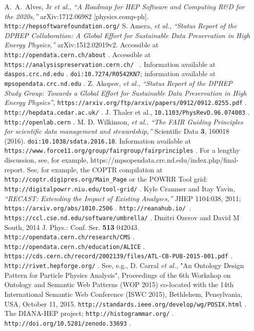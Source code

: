 \documentclass[11pt]{article}
\begin{document}
\begin{thebibliography}{99}
  A.~A.~Alves, Jr {\it et al.},
  {\it ``A Roadmap for HEP Software and Computing R\&D for the 2020s,''}
  arXiv:1712.06982 [physics.comp-ph].
 {\tt http://hepsoftwarefoundation.org/}
 S. Amera, {\it et al.}, {\it ``Status Report of the DPHEP Collaboration: A Global Effort for Sustainable Data Preservation in High Energy Physics,''} arXiv:1512.02019v2.
 Accessible at {\tt http://opendata.cern.ch/about} .
 Accessible at {\tt https://analysispreservation.cern.ch/ } .
 Information available at {\tt daspos.crc.nd.edu} .
 {\tt  doi:10.7274/R0542KN7}; information available at {\tt mpsopendata.crc.nd.edu} .
 Z. Akopov, {\it et al.}, {\it ``Status Report of the DPHEP Study Group: Towards a Global Effort for Sustainable Data Preservation in High Energy Physics''}, {\tt https://arxiv.org/ftp/arxiv/papers/0912/0912.0255.pdf} .
 {\tt http://hepdata.cedar.ac.uk/} .
 J. Thaler et al., {\tt 10.1103/PhysRevD.96.074003} .
 {\tt http://openlab.cern} .
 M. D. Wilkinson, {\it et al.}, {\it ``The FAIR Guiding Principles for scientific data management and stewardship,''} Scientific Data {\bf 3}, 160018 (2016).  {\tt doi:10.1038/sdata.2016.18}.  Information available at {\tt https://www.force11.org/group/fairgroup/fairprinciples} .
 For a lengthy discussion, see, for example, https://mpsopendata.crc.nd.edu/index.php/final-report.
 See, for example, the COPTR compilation at {\tt http://coptr.digipres.org/Main\_Page} or the POWRR Tool grid: {\tt http://digitalpowrr.niu.edu/tool-grid/} .
 Kyle Cranmer and Itay Yavin, {\it ``RECAST: Extending the Impact of Existing Analyses,''} JHEP 1104:038, 2011; {\tt https://arxiv.org/abs/1010.2506} .
 {\tt http://reanahub.io/ }.
 {\tt https://ccl.cse.nd.edu/software/umbrella/} .
 Dmitri Ozerov and David M South, 2014 J. Phys.: Conf. Ser. {\bf 513} 042043.
 {\tt http://opendata.cern.ch/research/CMS} .
 {\tt http://opendata.cern.ch/education/ALICE} .
 {\tt https://cds.cern.ch/record/2002139/files/ATL-CB-PUB-2015-001.pdf} .
  {\tt http://rivet.hepforge.org/} .
 See, e.g., D. Carral {\it et al.}, "An Ontology Design Pattern for Particle Physics Analysis", Proceedings of the 6th Workshop on Ontology and Semantic Web Patterns (WOP 2015) co-located with the 14th International Semantic Web Conference (ISWC 2015), Bethlehem, Pensylvania, USA, October 11, 2015.
 {\tt http://standards.ieee.org/develop/wg/POSIX.html} .
 The DIANA-HEP project;  {\tt http://histogrammar.org/} .
 {\tt http://doi.org/10.5281/zenodo.33693} .


\end{thebibliography}


 
\end{document}
